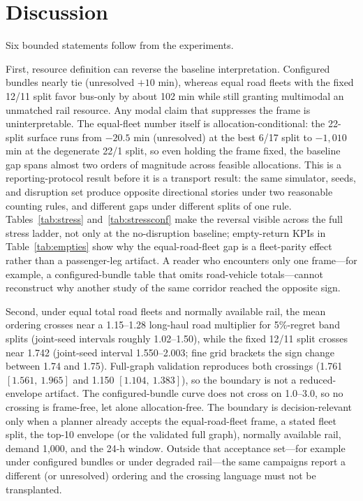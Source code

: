 \documentclass{ieeeaccess}
\begin{document}
\section{Discussion}
\label{sec:discussion}
Six bounded statements follow from the experiments.

First, resource definition can reverse the baseline interpretation. Configured bundles nearly tie (unresolved $+10$ min), whereas equal road fleets with the fixed 12/11 split favor bus-only by about 102 min while still granting multimodal an unmatched rail resource. Any modal claim that suppresses the frame is uninterpretable. The equal-fleet number itself is allocation-conditional: the 22-split surface runs from $-20.5$ min (unresolved) at the best 6/17 split to $-1{,}010$ min at the degenerate 22/1 split, so even holding the frame fixed, the baseline gap spans almost two orders of magnitude across feasible allocations. This is a reporting-protocol result before it is a transport result: the same simulator, seeds, and disruption set produce opposite directional stories under two reasonable counting rules, and different gaps under different splits of one rule. Tables~\ref{tab:stress} and~\ref{tab:stressconf} make the reversal visible across the full stress ladder, not only at the no-disruption baseline; empty-return KPIs in Table~\ref{tab:empties} show why the equal-road-fleet gap is a fleet-parity effect rather than a passenger-leg artifact. A reader who encounters only one frame---for example, a configured-bundle table that omits road-vehicle totals---cannot reconstruct why another study of the same corridor reached the opposite sign.

Second, under equal total road fleets and normally available rail, the mean ordering crosses near a 1.15--1.28 long-haul road multiplier for 5\%-regret band splits (joint-seed intervals roughly 1.02--1.50), while the fixed 12/11 split crosses near 1.742 (joint-seed interval 1.550--2.003; fine grid brackets the sign change between 1.74 and 1.75). Full-graph validation reproduces both crossings (1.761 $[1.561,\ 1.965]$ and 1.150 $[1.104,\ 1.383]$), so the boundary is not a reduced-envelope artifact. The configured-bundle curve does not cross on 1.0--3.0, so no crossing is frame-free, let alone allocation-free. The boundary is decision-relevant only when a planner already accepts the equal-road-fleet frame, a stated fleet split, the top-10 envelope (or the validated full graph), normally available rail, demand 1{,}000, and the 24-h window. Outside that acceptance set---for example under configured bundles or under degraded rail---the same campaigns report a different (or unresolved) ordering and the crossing language must not be transplanted.
\end{document}
